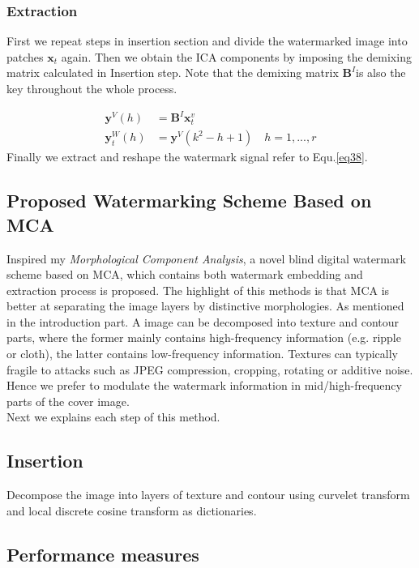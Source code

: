\subsubsection{Extraction}
First we repeat steps in insertion section and divide the watermarked image into patches $\mathbf{x}_t$ again. Then we obtain the ICA components by imposing the demixing matrix calculated in Insertion step. Note that the demixing matrix $\mathbf{B}^I$is also the key throughout the whole process.

\begin{align}
    \mathbf{y}^V(h)  &=  \mathbf{B}^I\mathbf{x}_t^v \\
    \mathbf{y}_t^W(h) &= \mathbf{y}^V(k^2-h+1) \quad h = 1,...,r
    \label{eq38}
\end{align}
Finally we extract and reshape the watermark signal refer to Equ.\ref{eq38}. 

\subsection{Proposed Watermarking Scheme Based on MCA}
Inspired my \textit{Morphological Component Analysis}, a novel blind digital watermark scheme based on MCA, which contains both watermark embedding and extraction process is proposed. The highlight of this methods is that MCA is better at separating the image layers by distinctive morphologies. As mentioned in the introduction part. A image can be decomposed into texture and contour parts, where the former mainly contains high-frequency information (e.g. ripple or cloth), the latter contains low-frequency information. Textures can typically fragile to attacks such as JPEG compression, cropping, rotating or additive noise.  Hence we prefer to modulate the watermark information in mid/high-frequency parts of the cover image.\\




Next we explains each step of this method.

\subsection{Insertion}
Decompose the image into layers of texture and contour using curvelet transform and local discrete cosine transform as dictionaries.



\subsection{Performance measures}
